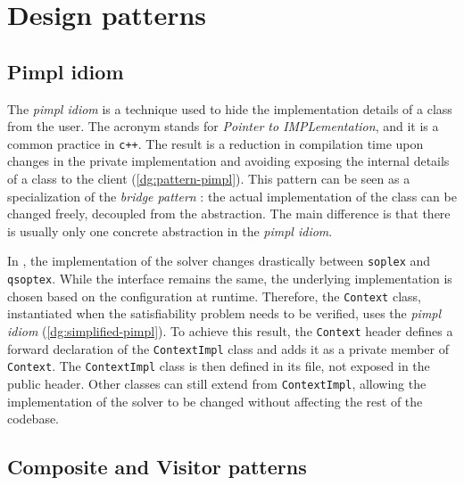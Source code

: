 \section{Design patterns}
\label{sec:patterns}

\subsection*{Pimpl idiom}

The \textit{pimpl idiom} \cite{man:pimpl} is a technique used to hide the implementation details of a class from the user.
The acronym stands for \textit{Pointer to IMPLementation}, and it is a common practice in \texttt{c++}.
The result is a reduction in compilation time upon changes in the private implementation and avoiding exposing the internal details of a class to the client (\autoref{dg:pattern-pimpl}).
This pattern can be seen as a specialization of the \textit{bridge pattern} \cite{book:gof}: the actual implementation of the class can be changed freely, decoupled from the abstraction.
The main difference is that there is usually only one concrete abstraction in the \textit{pimpl idiom}.


In \dlinear, the implementation of the solver changes drastically between \texttt{soplex} and \texttt{qsoptex}.
While the interface remains the same, the underlying implementation is chosen based on the configuration at runtime.
Therefore, the \texttt{Context} class, instantiated when the satisfiability problem needs to be verified, uses the \textit{pimpl idiom} (\autoref{dg:simplified-pimpl}).
To achieve this result, the \texttt{Context} header defines a forward declaration of the \texttt{ContextImpl} class and adds it as a private member of \texttt{Context}.
The \texttt{ContextImpl} class is then defined in its file, not exposed in the public header.
Other classes can still extend from \texttt{ContextImpl}, allowing the implementation of the solver to be changed without affecting the rest of the codebase.


\subsection*{Composite and Visitor patterns}

